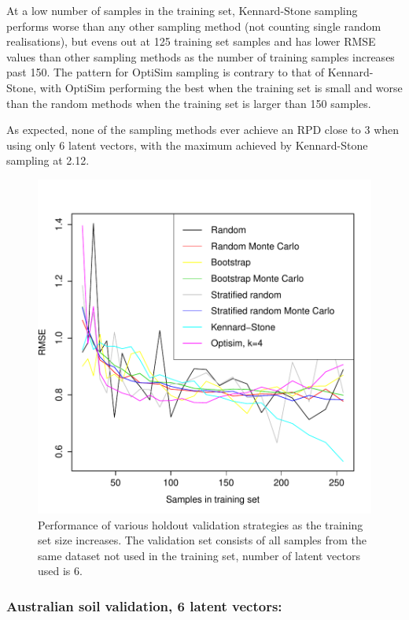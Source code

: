 \documentclass{isprs}
\begin{document}
At a low number of samples in the training set, Kennard-Stone sampling performs worse than any other sampling method (not counting single random realisations), but evens out at 125 training set samples and has lower RMSE values than other sampling methods as the number of training samples increases past 150. The pattern for OptiSim sampling is contrary to that of Kennard-Stone, with OptiSim performing the best when the training set is small and worse than the random methods when the training set is larger than 150 samples.

As expected, none of the sampling methods ever achieve an RPD close to 3 when using only 6 latent vectors, with the maximum achieved by Kennard-Stone sampling at 2.12.

\begin{figure}[ht!]
\includegraphics[width=1.0\columnwidth]{../script/output/rmse-nl-6.pdf}
\begin{center}
    \caption{Performance of various holdout validation strategies as the training set size increases. The validation set consists of all samples from the same dataset not used in the training set, number of latent vectors used is 6.}
    \label{fig:rmse-nl-6}
\end{center}
\end{figure}

\subsubsection{Australian soil validation, 6 latent vectors:}\label{sec:AU6}
\end{document}
